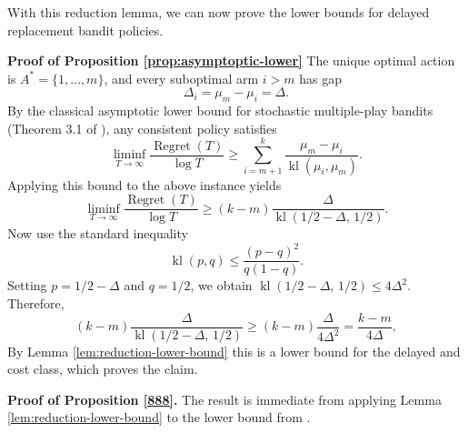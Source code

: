 \documentclass[opre,blindrev]{informs3}
\newcommand{\Regret}{\operatorname{Regret}}
\newcommand{\kl}{\operatorname{kl}}
\begin{document}
\begin{APPENDICES}
With this reduction lemma, we can now prove the lower bounds for delayed replacement bandit policies.


{\bf Proof of Proposition \ref{prop:asymptoptic-lower}}
    The unique optimal action is \(A^* = \{1,\dots,m\}\), and every suboptimal arm \(i > m\) has gap
    \[
    \Delta_i = \mu_m - \mu_i = \Delta.
    \]
    By the classical asymptotic lower bound for stochastic multiple-play bandits (Theorem 3.1 of \citealt{anantharam2003asymptotically}), any consistent policy satisfies
    \[
    \liminf_{T\to\infty}\frac{\Regret(T)}{\log T}
    \ge
    \sum_{i=m+1}^k \frac{\mu_m-\mu_i}{\kl(\mu_i,\mu_m)}.
    \]
    Applying this bound to the above instance yields
    \[
    \liminf_{T\to\infty}\frac{\Regret(T)}{\log T}
    \ge
    (k-m)\frac{\Delta}{\kl(1/2-\Delta,\,1/2)}.
    \]
    Now use the standard inequality
    \[
    \kl(p,q) \le \frac{(p-q)^2}{q(1-q)}.
    \]
    Setting \(p=1/2-\Delta\) and \(q=1/2\), we obtain \(\kl(1/2-\Delta,\,1/2) \le 4\Delta^2\).  Therefore,
    \[
    (k-m)\frac{\Delta}{\kl(1/2-\Delta,\,1/2)}
    \ge
    (k-m)\frac{\Delta}{4\Delta^2}
    =
    \frac{k-m}{4\Delta},
    \]
    By Lemma \ref{lem:reduction-lower-bound} this is a lower bound for the delayed and cost class, which proves the claim. \Halmos

{\bf Proof of Proposition \ref{888}.}
    The result is immediate from applying Lemma \ref{lem:reduction-lower-bound} to the lower bound from \cite{kveton2015tight}. \Halmos


\end{APPENDICES}
\end{document}
